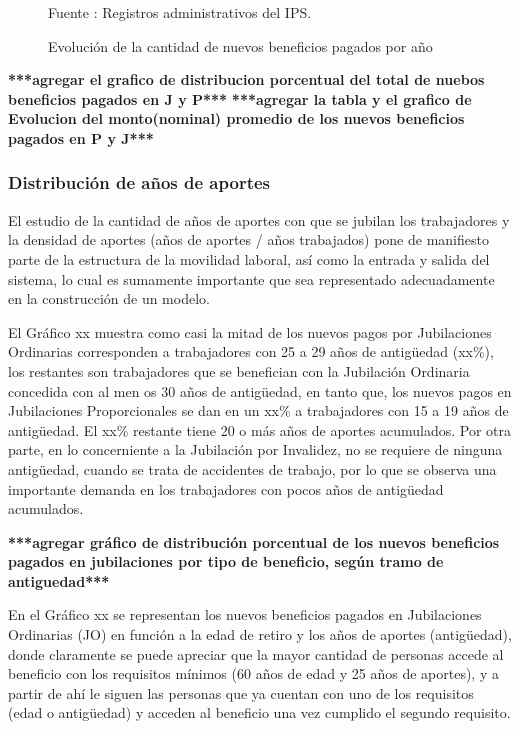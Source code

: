 \begin{figure}[H]
\begin{center}
\caption{Evolución de la cantidad de nuevos beneficios pagados por año}
                    \item \footnotesize Fuente : Registros administrativos del IPS. 
                    \end{center}
\end{figure}

\textbf{***agregar el grafico de distribucion porcentual del total de nuebos beneficios pagados en J y P***}
\textbf{***agregar la tabla y el grafico de Evolucion del monto(nominal) promedio de los nuevos beneficios pagados en P y J***}

\subsubsection{Distribución de años de aportes}

El estudio de la cantidad de años de aportes con que se jubilan los
trabajadores y la densidad de aportes (años de aportes / años
trabajados) pone de manifiesto parte de la estructura de la movilidad
laboral, así como la entrada y salida del sistema, lo cual es sumamente
importante que sea representado adecuadamente en la construcción de un
modelo.

El Gráfico xx muestra como casi la mitad de los nuevos pagos por
Jubilaciones Ordinarias corresponden a trabajadores con 25 a 29 años de
antigüedad (xx\%), los restantes son trabajadores que se benefician con
la Jubilación Ordinaria concedida con al men os 30 años de antigüedad,
en tanto que, los nuevos pagos en Jubilaciones Proporcionales se dan en
un xx\% a trabajadores con 15 a 19 años de antigüedad. El xx\% restante
tiene 20 o más años de aportes acumulados. Por otra parte, en lo
concerniente a la Jubilación por Invalidez, no se requiere de ninguna
antigüedad, cuando se trata de accidentes de trabajo, por lo que se
observa una importante demanda en los trabajadores con pocos años de
antigüedad acumulados.

\textbf{***agregar gráfico de distribución porcentual de los nuevos beneficios pagados en jubilaciones por tipo de beneficio, según tramo de antiguedad***}

En el Gráfico xx se representan los nuevos beneficios pagados en
Jubilaciones Ordinarias (JO) en función a la edad de retiro y los años
de aportes (antigüedad), donde claramente se puede apreciar que la mayor
cantidad de personas accede al beneficio con los requisitos mínimos (60
años de edad y 25 años de aportes), y a partir de ahí le siguen las
personas que ya cuentan con uno de los requisitos (edad o antigüedad) y
acceden al beneficio una vez cumplido el segundo requisito.

